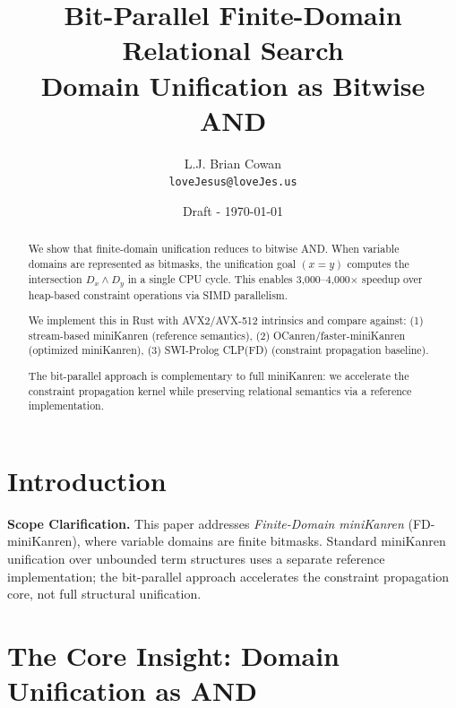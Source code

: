 \documentclass[11pt,a4paper]{article}
\title{Bit-Parallel Finite-Domain Relational Search\\
\large Domain Unification as Bitwise AND}
\author{
  L.J. Brian Cowan \\
  \texttt{loveJesus@loveJes.us}
}
\date{Draft - \today}
\newcommand{\fdmk}{FD-miniKanren\xspace}
\begin{document}
\maketitle

\begin{abstract}
We show that finite-domain unification reduces to bitwise AND.
When variable domains are represented as bitmasks, the unification goal
$(x = y)$ computes the intersection $D_x \land D_y$ in a single CPU cycle.
This enables 3,000--4,000$\times$ speedup over heap-based constraint operations
via SIMD parallelism.

We implement this in Rust with AVX2/AVX-512 intrinsics and compare against:
(1) stream-based miniKanren (reference semantics),
(2) OCanren/faster-miniKanren (optimized miniKanren),
(3) SWI-Prolog CLP(FD) (constraint propagation baseline).

The bit-parallel approach is complementary to full miniKanren:
we accelerate the constraint propagation kernel while preserving
relational semantics via a reference implementation.
\end{abstract}

\section{Introduction}

\textbf{Scope Clarification.}
This paper addresses \emph{Finite-Domain miniKanren} (\fdmk),
where variable domains are finite bitmasks.
Standard miniKanren unification over unbounded term structures uses a separate
reference implementation; the bit-parallel approach accelerates the constraint
propagation core, not full structural unification.


\section{The Core Insight: Domain Unification as AND}


\end{document}
